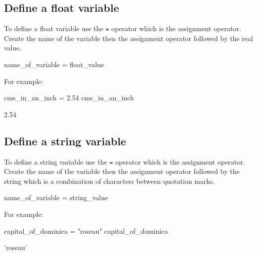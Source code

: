 \subsection{Define a float variable}
\label{\detokenize{building-tools/01-variables-conditionals-loops/how/main:define-a-float-variable}}

To define a float variable use the \texttt{=} operator which is the assignment
operator. Create the name of the variable then the assignment operator
followed by the real value.


\begin{api}
name_of_variable = float_value
\end{api}



For example:




\begin{pyin}
cms_in_an_inch = 2.54
cms_in_an_inch
\end{pyin}





\begin{raw}
2.54
\end{raw}





\subsection{Define a string variable}
\label{\detokenize{building-tools/01-variables-conditionals-loops/how/main:define-a-string-variable}}

To define a string variable use the \texttt{=} operator which is the assignment
operator. Create the name of the variable then the assignment operator
followed by the string which is a combination of characters between quotation
marks.


\begin{api}
name_of_variable = string_value
\end{api}



For example:




\begin{pyin}
capital_of_dominica = "roseau"
capital_of_dominica
\end{pyin}





\begin{raw}
'roseau'
\end{raw}






